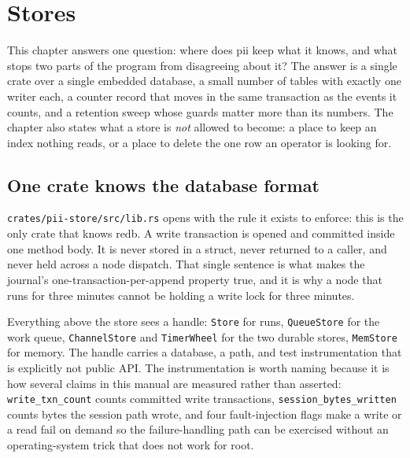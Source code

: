 \chapter{Stores}

\label{ch:stores}

This chapter answers one question: where does pii keep what it knows, and what stops two parts
of the program from disagreeing about it? The answer is a single crate over a single embedded
database, a small number of tables with exactly one writer each, a counter record that moves
in the same transaction as the events it counts, and a retention sweep whose guards matter
more than its numbers. The chapter also states what a store is \emph{not} allowed to become: a
place to keep an index nothing reads, or a place to delete the one row an operator is looking
for.

\section{One crate knows the database format}

\texttt{crates/pii-store/src/lib.rs} opens with the rule it exists to enforce: this is the
only crate that knows redb. A write transaction is opened and committed inside one method
body. It is never stored in a struct, never returned to a caller, and never held across a node
dispatch. That single sentence is what makes the journal's one-transaction-per-append property
true, and it is why a node that runs for three minutes cannot be holding a write lock for
three minutes.

Everything above the store sees a handle: \texttt{Store} for runs, \texttt{QueueStore} for the
work queue, \texttt{ChannelStore} and \texttt{TimerWheel} for the two durable stores,
\texttt{MemStore} for memory. The handle carries a database, a path, and test instrumentation
that is explicitly not public API. The instrumentation is worth naming because it is how
several claims in this manual are measured rather than asserted: \texttt{write\_txn\_count}
counts committed write transactions, \texttt{session\_bytes\_written} counts bytes the session
path wrote, and four fault-injection flags make a write or a read fail on demand so the
failure-handling path can be exercised without an operating-system trick that does not work
for root.

